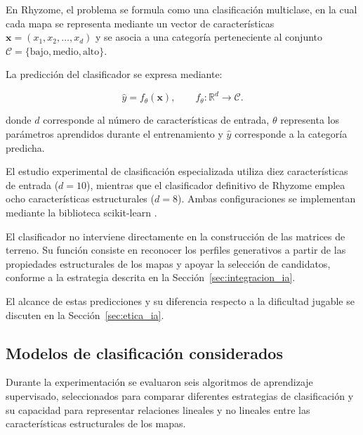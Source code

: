 En Rhyzome, el problema se formula como una clasificación multiclase, en la cual cada mapa se representa mediante un vector de características $\mathbf{x}=(x_1,x_2,\ldots,x_d)$ y se asocia a una categoría perteneciente al conjunto $\mathcal{C}=\{\text{bajo},\text{medio},\text{alto}\}$.

La predicción del clasificador se expresa mediante:

\begin{equation}
	\hat{y}=f_{\theta}(\mathbf{x}),
	\qquad
	f_{\theta}:\mathbb{R}^{d}\rightarrow\mathcal{C}.
	\label{eq:prediccion_complejidad}
\end{equation}

donde $d$ corresponde al número de características de entrada, $\theta$ representa los parámetros aprendidos durante el entrenamiento y $\hat{y}$ corresponde a la categoría predicha.

El estudio experimental de clasificación especializada utiliza diez características de entrada ($d=10$), mientras que el clasificador definitivo de Rhyzome emplea ocho características estructurales ($d=8$). Ambas configuraciones se implementan mediante la biblioteca scikit-learn \parencite{pedregosa2011}.

El clasificador no interviene directamente en la construcción de las matrices de terreno. Su función consiste en reconocer los perfiles generativos a partir de las propiedades estructurales de los mapas y apoyar la selección de candidatos, conforme a la estrategia descrita en la Sección~\ref{sec:integracion_ia}.

El alcance de estas predicciones y su diferencia respecto a la dificultad jugable se discuten en la Sección~\ref{sec:etica_ia}.


\subsection{Modelos de clasificación considerados}
\label{subsec:modelos_considerados}

Durante la experimentación se evaluaron seis algoritmos de aprendizaje supervisado, seleccionados para comparar diferentes estrategias de clasificación y su capacidad para representar relaciones lineales y no lineales entre las características estructurales de los mapas.

